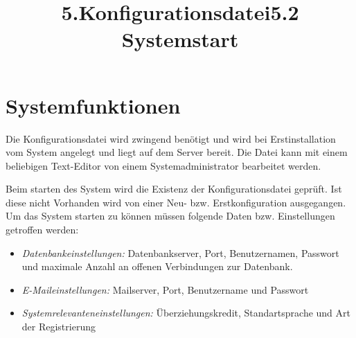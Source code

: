 \chapter{Systemfunktionen}

	\title{5.Konfigurationsdatei}
		Die Konfigurationsdatei wird zwingend benötigt und wird bei Erstinstallation vom System angelegt und liegt auf dem Server bereit. Die Datei kann mit einem beliebigen Text-Editor von einem Systemadministrator bearbeitet werden.
	

	\title{5.2 Systemstart}
		Beim starten des System wird die Existenz der Konfigurationsdatei geprüft. Ist diese nicht Vorhanden wird von einer Neu- bzw. Erstkonfiguration ausgegangen. Um das System starten zu können müssen folgende Daten bzw. Einstellungen getroffen werden:
		\begin{itemize}
			\item \emph{Datenbankeinstellungen:} Datenbankserver, Port, Benutzernamen, Passwort und maximale Anzahl an offenen Verbindungen zur Datenbank.
			\item \emph{E-Maileinstellungen:} Mailserver, Port, Benutzername und Passwort
			\item \emph{Systemrelevanteneinstellungen:} Überziehungskredit, Standartsprache und Art der Registrierung
		\end{itemize}
		
